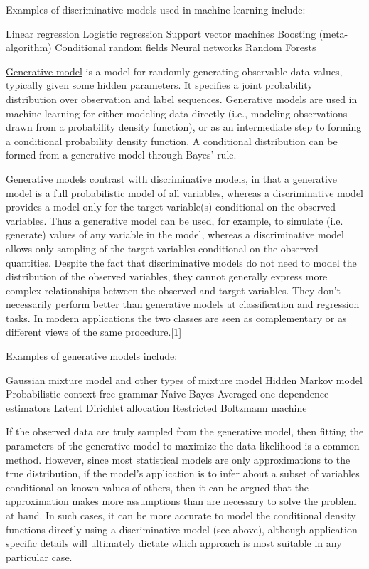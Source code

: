 \documentclass[a4paper,12pt,titlepage]{article} %
\begin{document}
Examples of discriminative models used in machine learning include:

    Linear regression
    Logistic regression
    Support vector machines
    Boosting (meta-algorithm)
    Conditional random fields
    Neural networks
    Random Forests


\underline{Generative model} is a model for randomly generating observable data values, typically given some hidden parameters. It specifies a joint probability distribution over observation and label sequences. Generative models are used in machine learning for either modeling data directly (i.e., modeling observations drawn from a probability density function), or as an intermediate step to forming a conditional probability density function. A conditional distribution can be formed from a generative model through Bayes' rule.

Generative models contrast with discriminative models, in that a generative model is a full probabilistic model of all variables, whereas a discriminative model provides a model only for the target variable(s) conditional on the observed variables. Thus a generative model can be used, for example, to simulate (i.e. generate) values of any variable in the model, whereas a discriminative model allows only sampling of the target variables conditional on the observed quantities. Despite the fact that discriminative models do not need to model the distribution of the observed variables, they cannot generally express more complex relationships between the observed and target variables. They don't necessarily perform better than generative models at classification and regression tasks. In modern applications the two classes are seen as complementary or as different views of the same procedure.[1]

Examples of generative models include:

    Gaussian mixture model and other types of mixture model
    Hidden Markov model
    Probabilistic context-free grammar
    Naive Bayes
    Averaged one-dependence estimators
    Latent Dirichlet allocation
    Restricted Boltzmann machine

If the observed data are truly sampled from the generative model, then fitting the parameters of the generative model to maximize the data likelihood is a common method. However, since most statistical models are only approximations to the true distribution, if the model's application is to infer about a subset of variables conditional on known values of others, then it can be argued that the approximation makes more assumptions than are necessary to solve the problem at hand. In such cases, it can be more accurate to model the conditional density functions directly using a discriminative model (see above), although application-specific details will ultimately dictate which approach is most suitable in any particular case.
\end{document}
